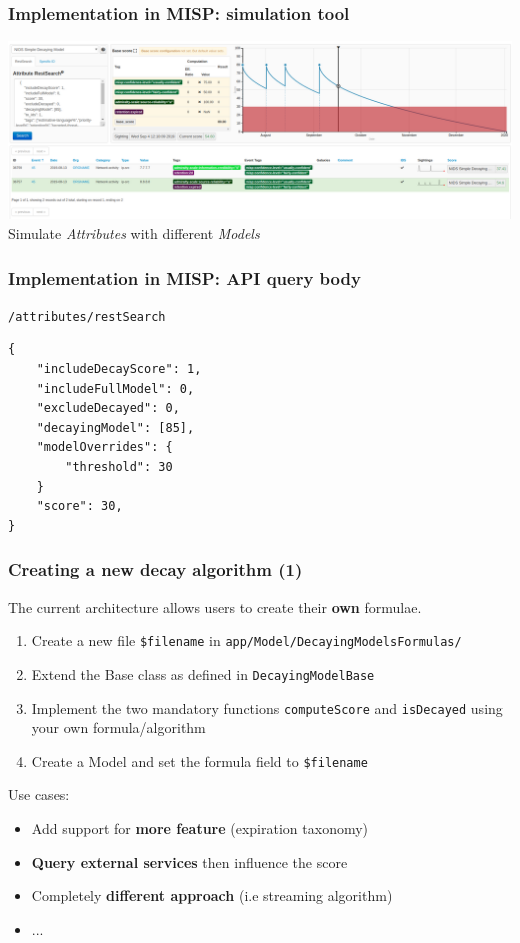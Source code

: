 \begin{frame}
    \frametitle{Implementation in MISP: simulation tool}
    \includegraphics[width=1.00\linewidth]{pics/decaying-simulation.png}
    Simulate \textit{Attributes} with different \textit{Models}
\end{frame}

\begin{frame}[fragile]
    \frametitle{Implementation in MISP: API query body}
    \texttt{/attributes/restSearch}
    \begin{lstlisting}
{
    "includeDecayScore": 1,
    "includeFullModel": 0,
    "excludeDecayed": 0,
    "decayingModel": [85],
    "modelOverrides": {
        "threshold": 30
    }
    "score": 30,
}
    \end{lstlisting}
\end{frame}

\begin{frame}
    \frametitle{Creating a new decay algorithm (1)}
    The current architecture allows users to create their \textbf{own} formulae.

    \begin{enumerate}
        \item Create a new file \texttt{{\$}filename} in \texttt{app/Model/DecayingModelsFormulas/}
        \item Extend the Base class as defined in \texttt{DecayingModelBase}
        \item Implement the two mandatory functions \texttt{computeScore} and \texttt{isDecayed} using your own formula/algorithm
        \item Create a Model and set the formula field to \texttt{{\$}filename}
    \end{enumerate}

    Use cases:
    \begin{itemize}
        \item Add support for \textbf{more feature} (expiration taxonomy)
        \item \textbf{Query external services} then influence the score
        \item Completely \textbf{different approach} (i.e streaming algorithm)
        \item ...
    \end{itemize}

\end{frame}

